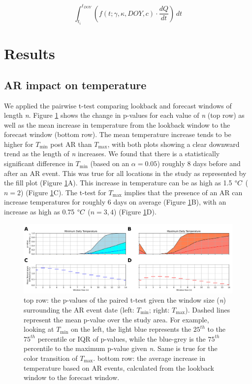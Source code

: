 \documentclass[12pts,draft]{AR_analysis_}
\begin{document}
\begin{equation}
\label{eq:final_eq}
	\int_{t_i}^{t_{DOY}} \left(f(t; \gamma, \kappa, DOY, c) \cdot
	\frac{dQ}{dt}\right) \, dt
\end{equation}



\section{Results} 

\subsection{AR impact on temperature}

We applied the pairwise t-test comparing lookback and forecast 
windows of length \emph{n}. Figure
\ref{fig:tmin_vs_tmax_subplots} shows the change in p-values for each
value of \emph{n} (top row) as well as the mean increase in temperature
from the lookback window to the forecast window (bottom row). The mean
temperature increase tends to be higher for $T_{\text{min}}$ post AR than  
$T_{\text{max}}$, with both plots
showing a clear downward trend as the length of \emph{n} 
increases. We found that there is a
statistically significant difference in $T_{\text{min}}$ 
(based on an $\alpha = 0.05$) roughly 8 days before and after 
an AR event. 
This was true for all locations in the study as represented 
by the fill plot (Figure \ref{fig:tmin_vs_tmax_subplots}A). 
This increase in 
temperature can be as high as 1.5 $\degree C$ ($n=2$) (Figure 
\ref{fig:tmin_vs_tmax_subplots}C). The t-test for
 $T_{\text{max}}$ implies that the presence of an AR can increase 
 temperatures for roughly 6 days on average (Figure 
 \ref{fig:tmin_vs_tmax_subplots}B), with an increase as high 
 as 0.75 $\degree C$ ($n={3, 4}$) (Figure 
 \ref{fig:tmin_vs_tmax_subplots}D).    

\begin{figure}
\centering
\includegraphics[width=1.0\textwidth]{./images/tmin_vs_tmax_subplots.png}
\caption{top row: the p-values of the paired t-test given the
	window size (\emph{n}) surrounding the AR event date (left:
	$T_{\text{min}}$; right: $T_{\text{max}}$). Dashed lines
	represent the mean p-value over the study area. For example, looking 
	at $T_{\text{min}}$ on the left, the light blue represents the $25^{th}$ to the 
	$75^{th}$ percentile or IQR of p-values, while the blue-grey is the $75^{th}$ 
	percentile to the maximum p-value given \emph{n}. Same is true for the 
	color transition of $T_{\text{max}}$. bottom row: the average increase
	in temperature based on AR events, calculated from the lookback 
	window to the forecast window.}
\label{fig:tmin_vs_tmax_subplots} 
\end{figure}
\end{document}
